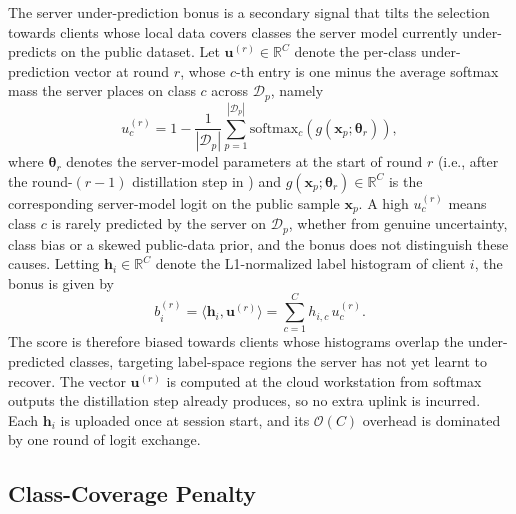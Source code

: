 \documentclass[journal]{IEEEtran}
\newcommand{\revIVE}[1]{#1}
\begin{document}
\revIVE{The server under-prediction bonus is a secondary signal that tilts the selection towards clients whose local data covers classes the server model currently under-predicts on the public dataset.} Let $\bm{u}^{(r)} \in \mathbb{R}^{C}$ denote the per-class under-prediction vector at round $r$, whose $c$-th entry is one minus the average softmax mass the server places on class $c$ across $\mathcal{D}_p$, namely
\begin{equation}
u_c^{(r)} = 1 - \frac{1}{|\mathcal{D}_p|}\sum_{p=1}^{|\mathcal{D}_p|} \mathrm{softmax}_c\!\left(g(\bm{x}_p; \bm{\theta}_r)\right),
\label{eq:uncert}
\end{equation}
where $\bm{\theta}_r$ denotes the server-model parameters at the start of round $r$ (i.e., after the round-$(r{-}1)$ distillation step in \cite[Algorithm~1]{mu2024fedtskd}) and $g(\bm{x}_p; \bm{\theta}_r) \in \mathbb{R}^{C}$ is the corresponding server-model logit on the public sample $\bm{x}_p$. \revIVE{A high $u_c^{(r)}$ means class $c$ is rarely predicted by the server on $\mathcal{D}_p$, whether from genuine uncertainty, class bias or a skewed public-data prior, and the bonus does not distinguish these causes.} Letting $\bm{h}_i \in \mathbb{R}^{C}$ denote the L1-normalized label histogram of client $i$, the bonus is given by
\begin{equation}
b_i^{(r)} = \langle \bm{h}_i, \bm{u}^{(r)} \rangle = \sum_{c=1}^{C} h_{i,c}\, u_c^{(r)}.
\label{eq:bonus}
\end{equation}
\revIVE{The score is therefore biased towards clients whose histograms overlap the under-predicted classes, targeting label-space regions the server has not yet learnt to recover. The vector $\bm{u}^{(r)}$ is computed at the cloud workstation from softmax outputs the distillation step already produces, so no extra uplink is incurred. Each $\bm{h}_i$ is uploaded once at session start, and its $\mathcal{O}(C)$ overhead is dominated by one round of logit exchange.}

\subsection{Class-Coverage Penalty}
\label{ssec:penalty-term}
\end{document}
